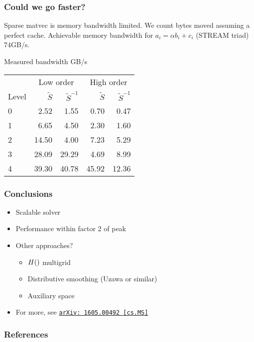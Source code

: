 \documentclass[presentation]{beamer}
\let\div\relax
\DeclareMathOperator{\div}{div}
\newcommand{\arxivlink}[2]{%
  \href{http://www.arxiv.org/abs/#1}%
  {{\small\texttt{arXiv:\,#1\,[#2]}}}%
}
\begin{document}
\begin{frame}
  \frametitle{Could we go faster?}
  Sparse matvec is memory bandwidth limited.  We count bytes moved
  assuming a perfect cache.  Achievable memory bandwidth for $a_i =
  \alpha b_i + c_i$ (STREAM triad) $74$GB/s.

  \begin{block}{Measured bandwidth GB/s}
    \begin{center}
      \begin{tabular}{lrrrr}
        & \multicolumn{2}{c}{Low order} & \multicolumn{2}{c}{High order}\\
        Level & $\tilde{S}$ & $\tilde{S}^{-1}$ & $\tilde{S}$ & $\tilde{S}^{-1}$\\
        0  &   2.52 &   1.55 &    0.70 &   0.47\\
        1  &   6.65 &   4.50 &    2.30 &   1.60\\
        2  &  14.50 &   4.00 &    7.23 &   5.29\\
        3  &  28.09 &  29.29 &    4.69 &   8.99\\
        4  &  39.30 &  40.78 &   45.92 &  12.36\\
      \end{tabular}
    \end{center}
  \end{block}
\end{frame}

\begin{frame}
  \frametitle{Conclusions}

  \begin{itemize}
  \item Scalable solver
  \item Performance within factor 2 of peak
  \item Other approaches?
    \begin{itemize}
    \item $H(\div)$ multigrid \parencite{Arnold:2000}
    \item Distributive smoothing (Uzawa or similar)
    \item Auxiliary space \parencite{Hiptmair:2007}
    \end{itemize}
  \item For more, see \arxivlink{1605.00492}{cs.MS}
  \end{itemize}
\end{frame}

\appendix
\begin{frame}
  \frametitle{References}
  \printbibliography[heading=none]
\end{frame}
\end{document}
